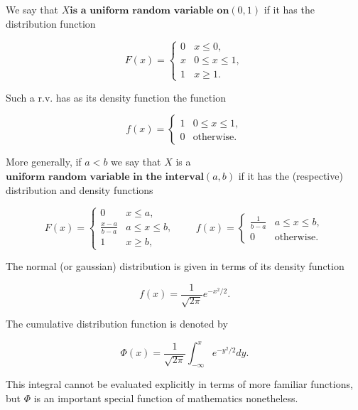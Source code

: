 \begin{example}
We say that $\textbf{$X
$is a uniform random variable on$(0,1)$}$ if it has
the distribution function

\[
F(x) = \begin{cases} 0 & x \le 0, \\
x & 0\le x \le 1, \\
1 & x \ge 1.
\end{cases}
\]

\noindent Such a r.v. has as its density function the function

\[
f(x) = \begin{cases} 1 & 0\le x\le 1,\\ 0&\textrm{otherwise.}\end{cases}
\]

\noindent More generally, if $a<b$ we say that $X$ is a
$\textbf{uniform random variable in the interval$(a,b)
$}$ if it has the (respective) distribution and
density functions

\[
F(x) = \begin{cases} 0 & x \le a, \\ \frac{x-a}{b-a} & a\le x\le b, \\ 1 & x\ge b, \end{cases}
\qquad
f(x) = \begin{cases} \frac{1}{b-a} & a\le x\le b, \\ 0 & \textrm{otherwise.}
\end{cases}
\]

\end{example}

\begin{example}
The normal (or gaussian) distribution is given in
terms of its density function

\[
f(x) = \frac{1}{\sqrt{2\pi}} e^{-x^2/2}.
\]

\noindent The cumulative distribution function is denoted by

\[
\Phi(x) = \frac{1}{\sqrt{2\pi}} \int_{-\infty}^x e^{-y^2/2} dy.
\]

\noindent This integral cannot be evaluated explicitly in terms
of more familiar functions, but $\Phi$ is an
important special function of mathematics nonetheless.
\end{example}
